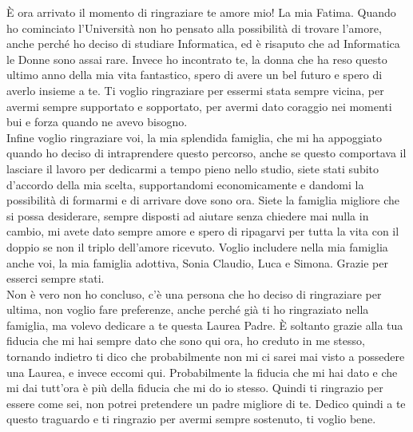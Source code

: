 \`E ora arrivato il momento di ringraziare te amore mio! La mia Fatima. Quando ho cominciato l'Universit\`a non ho pensato alla possibilit\`a di trovare l'amore, anche perch\'e ho deciso di studiare Informatica, ed \`e risaputo che ad Informatica le Donne sono assai rare. Invece ho incontrato te, la donna che ha reso questo ultimo anno della mia vita fantastico, spero di avere un bel futuro e spero di averlo insieme a te. Ti voglio ringraziare per essermi stata sempre vicina, per avermi sempre supportato e sopportato, per avermi dato coraggio nei momenti bui e forza quando ne avevo bisogno.\\
Infine voglio ringraziare voi, la mia splendida famiglia, che mi ha appoggiato quando ho deciso di intraprendere questo percorso, anche se questo comportava il lasciare il lavoro per dedicarmi a tempo pieno nello studio, siete stati subito d'accordo della mia scelta, supportandomi economicamente e dandomi la possibilit\`a di formarmi e di arrivare dove sono ora. Siete la famiglia migliore che si possa desiderare, sempre disposti ad aiutare senza chiedere mai nulla in cambio, mi avete dato sempre amore e spero di ripagarvi per tutta la vita con il doppio se non il triplo dell'amore ricevuto. Voglio includere nella mia famiglia anche voi, la mia famiglia adottiva, Sonia Claudio, Luca e Simona. Grazie per esserci sempre stati.\\
Non \`e vero non ho concluso, c'\`e una persona che ho deciso di ringraziare per ultima, non voglio fare preferenze, anche perch\'e gi\`a ti ho ringraziato nella famiglia, ma volevo dedicare a te questa Laurea Padre. \`E soltanto grazie alla tua fiducia che mi hai sempre dato che sono qui ora, ho creduto in me stesso, tornando indietro ti dico che probabilmente non mi ci sarei mai visto a possedere una Laurea, e invece eccomi qui. Probabilmente la fiducia che mi hai dato e che mi dai tutt'ora \`e pi\`u della fiducia che mi do io stesso. Quindi ti ringrazio per essere come sei, non potrei pretendere un padre migliore di te. Dedico quindi a te questo traguardo e ti ringrazio per avermi sempre sostenuto, ti voglio bene.